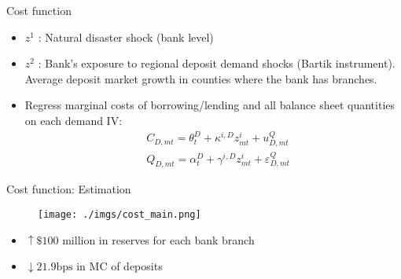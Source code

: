 \documentclass[notes,11pt, aspectratio=169]{beamer}
\begin{document}
        \begin{frame}{Cost function}\label{cost}
            \vspace{0.5cm}
    
              \begin{itemize}
    
                \item  $z^1$ : Natural disaster shock (bank level)
                \item  $z^2$ : Bank's exposure to regional deposit demand shocks (Bartik instrument). Average deposit market growth in counties where the bank has branches.
                \vspace{0.5cm}
                \item  Regress marginal costs of borrowing/lending and all balance sheet quantities on each demand IV: %
                $$
                \begin{aligned}
                & C_{D, m t}=\theta_t^D+\kappa^{i, D} z_{m t}^i+u_{D, m t}^Q \\
                & Q_{D, m t}=\alpha_t^D+\gamma^{i, D} z_{m t}^i+\varepsilon_{D, m t}^Q
                \end{aligned}
                $$
        

                \end{itemize}
    \end{frame}

\begin{frame}{Cost function: Estimation}\label{cost}
    \vspace{0.5cm}

      
        \begin{figure}[t*]
          \centering
    
          \texttt{[image: ./imgs/cost\_main.png]}
        \end{figure}

        \hyperlink{costiv}{}

              \begin{itemize}
        \item $\uparrow \$ 100$ million in reserves for each bank branch
        \item $\downarrow 21.9 \mathrm{bps} $ in MC of deposits
      \end{itemize}
        
    \end{frame}
\end{document}
